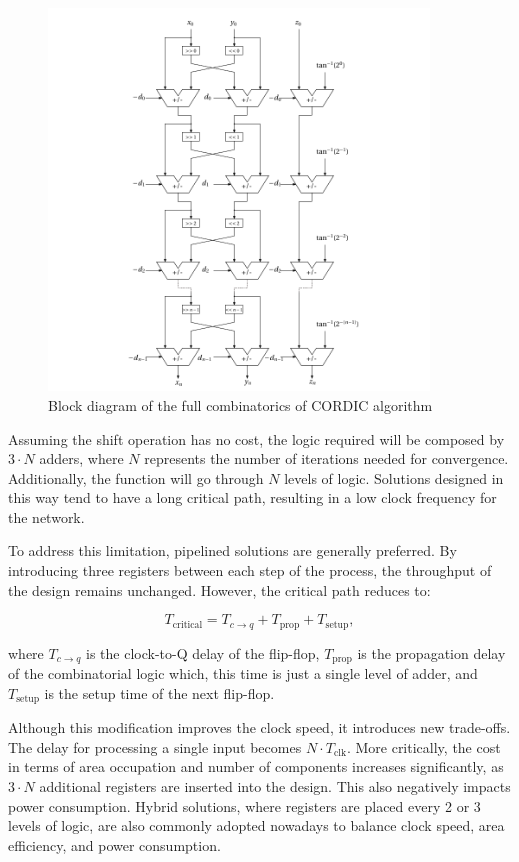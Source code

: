 \begin{figure}[H]
    \centering
    \includegraphics[width=0.9\textwidth]{images/Architecture/pipelined_CORDIC.pdf}
    \caption{Block diagram of the full combinatorics of CORDIC algorithm}
    \label{fig:pipeline_CORDIC}
\end{figure}

Assuming the shift operation has no cost, the logic required will be composed by \(3 \cdot N\) adders, where \(N\) represents the number of iterations needed for convergence. Additionally, the function will go through \(N\) levels of logic. Solutions designed in this way tend to have a long critical path, resulting in a low clock frequency for the network.

To address this limitation, pipelined solutions are generally preferred. By introducing three registers between each step of the process, the throughput of the design remains unchanged. However, the critical path reduces to:

\[
T_{\text{critical}} = T_{c \to q} + T_{\text{prop}} + T_{\text{setup}},
\]

where \(T_{c \to q}\) is the clock-to-Q delay of the flip-flop, \(T_{\text{prop}}\) is the propagation delay of the combinatorial logic which, this time is just a single level of adder, and \(T_{\text{setup}}\) is the setup time of the next flip-flop.

Although this modification improves the clock speed, it introduces new trade-offs. The delay for processing a single input becomes \(N \cdot T_{\text{clk}}\). More critically, the cost in terms of area occupation and number of components increases significantly, as \(3 \cdot N\) additional registers are inserted into the design. This also negatively impacts power consumption. Hybrid solutions, where registers are placed every 2 or 3 levels of logic, are also commonly adopted nowadays to balance clock speed, area efficiency, and power consumption.

